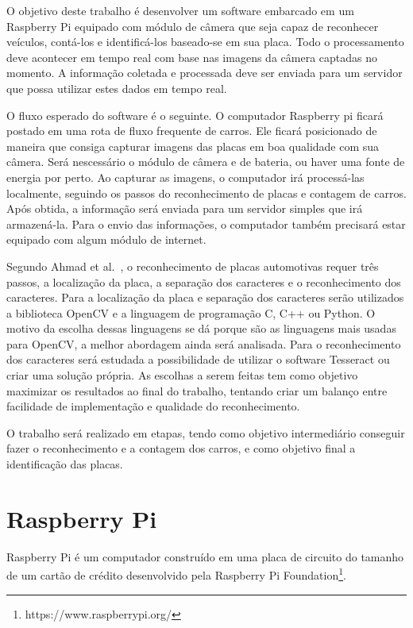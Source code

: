 
O objetivo deste trabalho é desenvolver um software embarcado em um Raspberry Pi
equipado com módulo de câmera que seja capaz de reconhecer veículos, contá-los e
identificá-los baseado-se em sua placa. Todo o processamento deve acontecer em
tempo real com base nas imagens da câmera captadas no momento. A informação
coletada e processada deve ser enviada para um servidor que possa utilizar estes
dados em tempo real.

O fluxo esperado do software é o seguinte. O computador Raspberry pi ficará postado
em uma rota de fluxo frequente de carros. Ele ficará posicionado de maneira que consiga capturar
imagens das placas em boa qualidade com sua câmera. Será nescessário o módulo de câmera
e de bateria, ou haver uma fonte de energia por perto. Ao capturar as imagens, o computador
irá processá-las localmente, seguindo os passos do reconhecimento de placas e contagem de carros.
Após obtida, a informação será enviada para um servidor simples que irá armazená-la. Para o envio
das informações, o computador também precisará estar equipado com algum módulo de internet.

Segundo Ahmad et al.~\cite{ahmad2015automatic}, o reconhecimento de placas automotivas requer
três passos, a localização da placa, a separação dos caracteres e o
reconhecimento dos caracteres. Para a localização da placa e separação dos
caracteres serão utilizados a biblioteca OpenCV e a linguagem de programação C,
C++ ou Python. O motivo da escolha dessas linguagens se dá porque são as linguagens mais usadas 
para OpenCV, a melhor abordagem ainda será analisada. Para o reconhecimento dos caracteres será
estudada a possibilidade de utilizar o software Tesseract ou criar uma solução
própria. As escolhas a serem feitas tem como objetivo maximizar os resultados ao
final do trabalho, tentando criar um balanço entre facilidade de implementação e
qualidade do reconhecimento.

O trabalho será realizado em etapas, tendo como objetivo intermediário conseguir
fazer o reconhecimento e a contagem dos carros, e como objetivo final a
identificação das placas.

\section{Raspberry Pi}
\label{sec:raspi}

Raspberry Pi é um computador construído em uma placa de circuito do tamanho de
um cartão de crédito desenvolvido pela Raspberry Pi
Foundation\footnote{https://www.raspberrypi.org/}.

